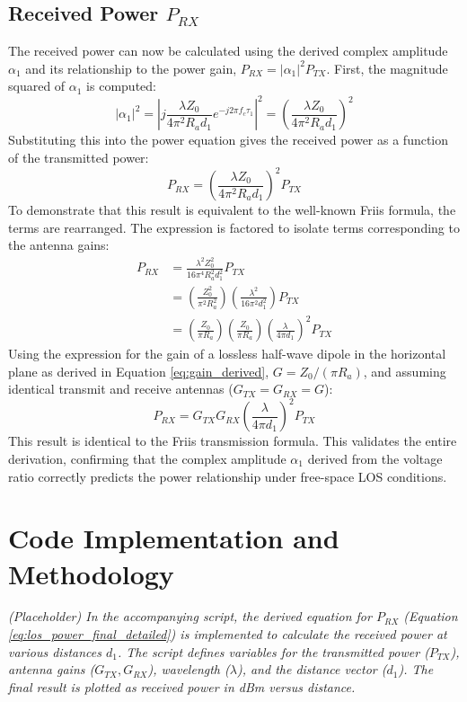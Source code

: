 \subsection{Received Power $P_{RX}$}
The received power can now be calculated using the derived complex amplitude $\alpha_1$ and its relationship to the power gain, $P_{RX} = |\alpha_1|^2 P_{TX}$. First, the magnitude squared of $\alpha_1$ is computed:
\begin{equation}
	|\alpha_1|^2 = \left| j \frac{\lambda Z_0}{4\pi^2 R_a d_1} e^{-j2\pi f_c \tau_1} \right|^2 = \left( \frac{\lambda Z_0}{4\pi^2 R_a d_1} \right)^2
\end{equation}
Substituting this into the power equation gives the received power as a function of the transmitted power:
\begin{equation}
	P_{RX} = \left( \frac{\lambda Z_0}{4\pi^2 R_a d_1} \right)^2 P_{TX}
\end{equation}
To demonstrate that this result is equivalent to the well-known Friis formula, the terms are rearranged. The expression is factored to isolate terms corresponding to the antenna gains:
\begin{align}
	P_{RX} &= \frac{\lambda^2 Z_0^2}{16\pi^4 R_a^2 d_1^2} P_{TX} \\
	&= \left( \frac{Z_0^2}{\pi^2 R_a^2} \right) \left( \frac{\lambda^2}{16\pi^2 d_1^2} \right) P_{TX} \\
	&= \left( \frac{Z_0}{\pi R_a} \right) \left( \frac{Z_0}{\pi R_a} \right) \left( \frac{\lambda}{4\pi d_1} \right)^2 P_{TX}
\end{align}
Using the expression for the gain of a lossless half-wave dipole in the horizontal plane as derived in Equation \ref{eq:gain_derived}, $G = Z_0/(\pi R_a)$, and assuming identical transmit and receive antennas ($G_{TX} = G_{RX} = G$):
\begin{equation}
	P_{RX} = G_{TX} G_{RX} \left( \frac{\lambda}{4\pi d_1} \right)^2 P_{TX} \label{eq:los_power_final_detailed}
\end{equation}
This result is identical to the Friis transmission formula. This validates the entire derivation, confirming that the complex amplitude $\alpha_1$ derived from the voltage ratio correctly predicts the power relationship under free-space LOS conditions.

\section{Code Implementation and Methodology}
\textit{(Placeholder) In the accompanying script, the derived equation for $P_{RX}$ (Equation \ref{eq:los_power_final_detailed}) is implemented to calculate the received power at various distances $d_1$. The script defines variables for the transmitted power ($P_{TX}$), antenna gains ($G_{TX}, G_{RX}$), wavelength ($\lambda$), and the distance vector ($d_1$). The final result is plotted as received power in dBm versus distance.}

